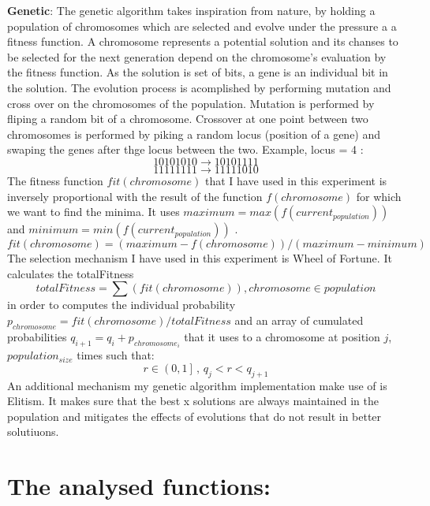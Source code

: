 \documentclass{report}
\begin{document}
\noindent
\textbf{Genetic}:
\newline
\newline
The genetic algorithm takes inspiration from nature, by holding a population of chromosomes which are selected and evolve under the pressure a a fitness function.
A chromosome represents a potential solution and its chanses to be selected for the next generation depend on the chromosome's evaluation by the fitness function.
As the solution is set of bits, a gene is an individual bit in the solution. The evolution process is acomplished by performing mutation and cross over on the chromosomes of the population.
\newline
\newline
Mutation is performed by fliping a random bit of a chromosome.
\newline
\newline
Crossover at one point between two chromosomes is performed by piking a random locus (position of a gene) and swaping the genes after thge locus between the two. Example, locus = 4 :
$$10101010 \rightarrow 10101111 $$
$$11111111 \rightarrow 11111010 $$
\newline
The fitness function $fit(chromosome)$ that I have used in this experiment is inversely proportional with the result of the function $f(chromosome)$ for which we want to find the minima.
It uses $maximum = max(f(current_{population}))$ and $minimum = min(f(current_{population}))$ .
\newline
$$fit(chromosome) = (maximum - f(chromosome)) / (maximum- minimum)$$
\newline
The selection mechanism I have used in this experiment is Wheel of Fortune. It calculates the totalFitness
$$totalFitness = \sum(fit(chromosome))  , chromosome \in population$$
in order to computes the individual probability $p_{chromosome} = fit(chromosome) /  totalFitness$
and an array of cumulated probabilities $q_{i + 1} = q_{i} + p_{chromosome_i}$ that it uses to a chromosome at position $j$,  $population_{size}$ times such that:
$$r \in \left(0, 1 \right] \, , \, q_j < r < q_{j + 1}$$
\newline
An additional mechanism my genetic algorithm implementation make use of is Elitism. It makes sure that the best x solutions are always maintained in the population and mitigates the effects
of evolutions that do not result in better solutiuons.

\pagebreak

\section*{The analysed functions:}
\end{document}
